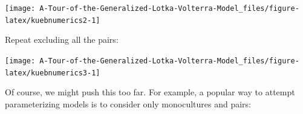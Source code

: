\documentclass[
]{book}
\newenvironment{Shaded}{\begin{snugshade}}{\end{snugshade}}
\newcommand{\DataTypeTok}[1]{\textcolor[rgb]{0.13,0.29,0.53}{#1}}
\newcommand{\DecValTok}[1]{\textcolor[rgb]{0.00,0.00,0.81}{#1}}
\newcommand{\KeywordTok}[1]{\textcolor[rgb]{0.13,0.29,0.53}{\textbf{#1}}}
\newcommand{\NormalTok}[1]{#1}
\newcommand{\OperatorTok}[1]{\textcolor[rgb]{0.81,0.36,0.00}{\textbf{#1}}}
\newcommand{\StringTok}[1]{\textcolor[rgb]{0.31,0.60,0.02}{#1}}
\begin{document}
\begin{center}\texttt{[image: A-Tour-of-the-Generalized-Lotka-Volterra-Model\_files/figure-latex/kuebnumerics2-1]} \end{center}

Repeat excluding all the pairs:

\begin{Shaded}
\end{Shaded}

\begin{center}\texttt{[image: A-Tour-of-the-Generalized-Lotka-Volterra-Model\_files/figure-latex/kuebnumerics3-1]} \end{center}

Of course, we might push this too far. For example, a popular way to attempt parameterizing models is to consider only monocultures and pairs:
\end{document}
